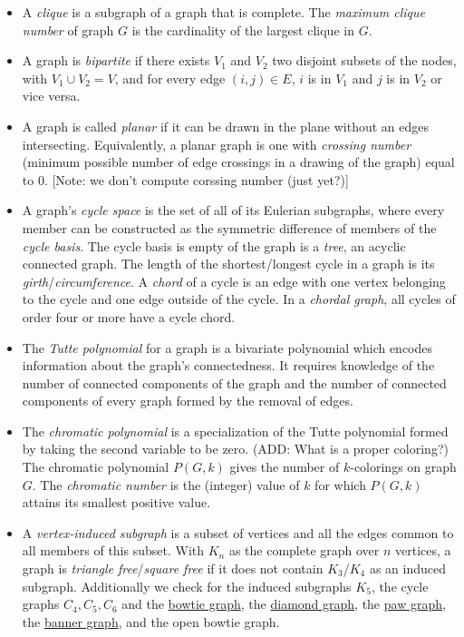 \documentclass[12pt]{article}
\newcommand{\bowtiegraph}{\href{http://mathworld.wolfram.com/ButterflyGraph.html}{bowtie graph}}
\newcommand{\diamondgraph}{\href{http://mathworld.wolfram.com/DiamondGraph.html}{diamond graph}}
\newcommand{\pawgraph}{\href{http://mathworld.wolfram.com/PawGraph.html}{paw graph}}
\newcommand{\bannergraph}{\href{http://mathworld.wolfram.com/BannerGraph.html}{banner graph}}
\begin{document}
\begin{itemize}
\item A \textit{clique} is a subgraph of a graph that is complete. The \textit{maximum clique number} of graph $G$ is the cardinality of the largest clique in $G$. 

\item A graph is \textit{bipartite} if there exists $V_1$ and $V_2$ two disjoint subsets of the nodes, with $V_1 \cup V_2 = V$, and for every edge $(i,j) \in E$,  $i$ is in $V_1$ and $j$ is in $V_2$ or vice versa.

\item A graph is called \textit{planar} if it can be drawn in the plane without an edges intersecting. Equivalently, a planar graph is one with \textit{crossing number} (minimum possible number of edge crossings in a drawing of the graph) equal to 0. [Note: we don't compute corssing number (just yet?)]

\item A graph's \textit{cycle space} is the set of all of its Eulerian subgraphs, where every member can be constructed as the symmetric difference of members of the \textit{cycle basis}. 
The cycle basis is empty of the graph is a \textit{tree}, an acyclic connected graph.
The length of the shortest/longest cycle in a graph is its \textit{girth}/\textit{circumference}.
A \textit{chord} of a cycle is an edge with one vertex belonging to the cycle and one edge outside of the cycle.
In a \textit{chordal graph}, all cycles of order four or more have a cycle chord.   
 
\item The \textit{Tutte polynomial} for a graph is a bivariate polynomial which encodes information about the graph's connectedness. 
It requires knowledge of the number of connected components of the graph and the number of connected components of every graph formed by the removal of edges. 

\item The \textit{chromatic polynomial} is a specialization of the Tutte polynomial formed by taking the second variable to be zero. 
(ADD: What is a proper coloring?)
The chromatic polynomial $P(G,k)$ gives the number of $k$-colorings on graph $G$. 
The \textit{chromatic number} is the (integer) value of $k$ for which $P(G,k)$ attains its smallest positive value. 

\item A \textit{vertex-induced subgraph} is a subset of vertices and all the edges common to all members of this subset. 
With $K_n$ as the complete graph over $n$ vertices, a graph is \textit{triangle free}/\textit{square free} if it does not contain $K_3$/$K_4$ as an induced subgraph.
Additionally we check for the induced subgraphs $K_5$, the cycle graphs $C_4, C_5, C_6$ and the \bowtiegraph, the \diamondgraph, the \pawgraph, the \bannergraph, and the open bowtie graph. 


\end{itemize}
\end{document}

